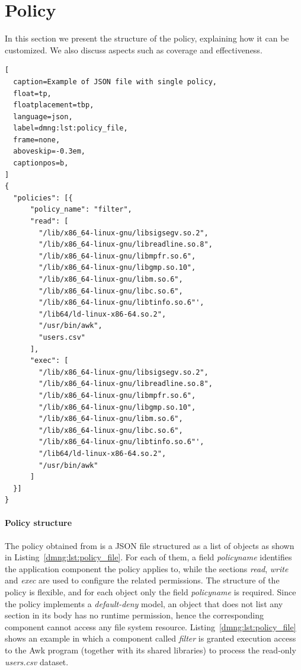 \section{Policy}\label{dmng:sect:policy}

In this section we present the structure of the policy, explaining how
it can be customized. We also discuss aspects such as coverage and
effectiveness.

\begin{lstlisting}[
  caption=Example of JSON file with single policy,
  float=tp,
  floatplacement=tbp,
  language=json,
  label=dmng:lst:policy_file,
  frame=none,
  aboveskip=-0.3em,
  captionpos=b,
]
{
  "policies": [{
      "policy_name": "filter",
      "read": [
        "/lib/x86_64-linux-gnu/libsigsegv.so.2",
        "/lib/x86_64-linux-gnu/libreadline.so.8",
        "/lib/x86_64-linux-gnu/libmpfr.so.6",
        "/lib/x86_64-linux-gnu/libgmp.so.10",
        "/lib/x86_64-linux-gnu/libm.so.6",
        "/lib/x86_64-linux-gnu/libc.so.6",
        "/lib/x86_64-linux-gnu/libtinfo.so.6"',
        "/lib64/ld-linux-x86-64.so.2",
        "/usr/bin/awk",
        "users.csv"
      ],
      "exec": [
        "/lib/x86_64-linux-gnu/libsigsegv.so.2",
        "/lib/x86_64-linux-gnu/libreadline.so.8",
        "/lib/x86_64-linux-gnu/libmpfr.so.6",
        "/lib/x86_64-linux-gnu/libgmp.so.10",
        "/lib/x86_64-linux-gnu/libm.so.6",
        "/lib/x86_64-linux-gnu/libc.so.6",
        "/lib/x86_64-linux-gnu/libtinfo.so.6"',
        "/lib64/ld-linux-x86-64.so.2",
        "/usr/bin/awk"
      ]
  }]
}
\end{lstlisting}

\paragraph*{Policy structure} The policy obtained from \dmng is a JSON
file structured as a list of objects as shown in
Listing~\ref{dmng:lst:policy_file}. For each of them, a field {\em
  policy\textunderscore name} identifies the application component the
policy applies to, while the sections {\em read}, {\em write} and {\em
  exec} are used to configure the related permissions. The structure
of the policy is flexible, and for each object only the field {\em
  policy\textunderscore name} is required. Since the policy implements
a \mbox{{\em default-deny}} model, an object that does not list any
section in its body has no runtime permission, hence the corresponding
component cannot access any file system
resource. Listing~\ref{dmng:lst:policy_file} shows an example in which a
component called {\em filter} is granted execution access to the Awk
program (together with its shared libraries) to process the
\mbox{read-only} {\em users.csv} dataset.

